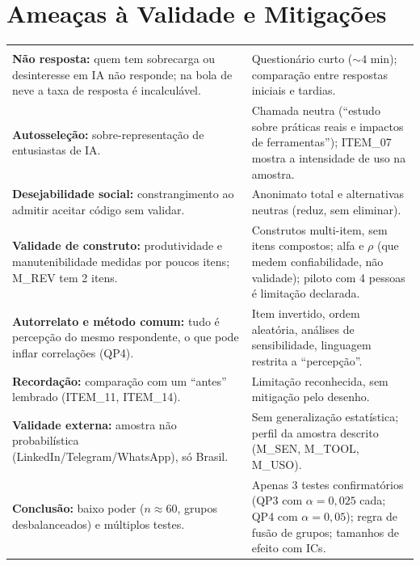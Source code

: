\section{Ameaças à Validade e Mitigações}

{\footnotesize
{}
\renewcommand{\arraystretch}{1.35}
\setlength{\tabcolsep}{5pt}
\begin{longtable}{|L{7.65cm}|L{8.95cm}|}
\hline
{}
 &  \\
\hline
\endfirsthead
\hline
{}
 &  \\
\hline
\endhead
\hline
\endfoot
\textbf{Não resposta:} quem tem sobrecarga ou desinteresse em IA não responde; na bola de neve a taxa de resposta é incalculável. & Questionário curto ($\sim 4$ min); comparação entre respostas iniciais e tardias. \\ \hline
\textbf{Autosseleção:} sobre-representação de entusiastas de IA. & Chamada neutra (\enquote{estudo sobre práticas reais e impactos de ferramentas}); ITEM\_07 mostra a intensidade de uso na amostra. \\ \hline
\textbf{Desejabilidade social:} constrangimento ao admitir aceitar código sem validar. & Anonimato total e alternativas neutras (reduz, sem eliminar). \\ \hline
\textbf{Validade de construto:} produtividade e manutenibilidade medidas por poucos itens; M\_REV tem 2 itens. & Construtos multi-item, sem itens compostos; alfa e $\rho$ (que medem confiabilidade, não validade); piloto com 4 pessoas é limitação declarada. \\ \hline
\textbf{Autorrelato e método comum:} tudo é percepção do mesmo respondente, o que pode inflar correlações (QP4). & Item invertido, ordem aleatória, análises de sensibilidade, linguagem restrita a \enquote{percepção}. \\ \hline
\textbf{Recordação:} comparação com um \enquote{antes} lembrado (ITEM\_11, ITEM\_14). & Limitação reconhecida, sem mitigação pelo desenho. \\ \hline
\textbf{Validade externa:} amostra não probabilística (LinkedIn/Telegram/WhatsApp), só Brasil. & Sem generalização estatística; perfil da amostra descrito (M\_SEN, M\_TOOL, M\_USO). \\ \hline
\textbf{Conclusão:} baixo poder ($n \approx 60$, grupos desbalanceados) e múltiplos testes. & Apenas 3 testes confirmatórios (QP3 com $\alpha = 0{,}025$ cada; QP4 com $\alpha = 0{,}05$); regra de fusão de grupos; tamanhos de efeito com ICs. \\ \hline
\end{longtable}
}
